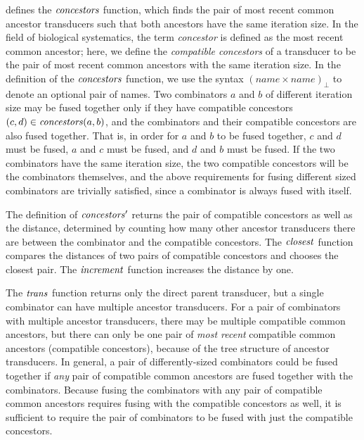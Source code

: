  defines the $\mathit{concestors}$ function, which finds the pair of most recent common ancestor transducers such that both ancestors have the same iteration size.
In the field of biological systematics, the term \emph{concestor} is defined as the most recent common ancestor; here, we define the \emph{compatible concestors} of a transducer to be the pair of most recent common ancestors with the same iteration size.
In the definition of the $\mathit{concestors}$ function, we use the syntax $(name \times name)_\bot$ to denote an optional pair of names.
Two combinators $a$ and $b$ of different iteration size may be fused together only if they have compatible concestors $(c, d) \in \mathit{concestors}(a,b)$, and the combinators and their compatible concestors are also fused together.
That is, in order for $a$ and $b$ to be fused together, $c$ and $d$ must be fused, $a$ and $c$ must be fused, and $d$ and $b$ must be fused.
If the two combinators have the same iteration size, the two compatible concestors will be the combinators themselves, and the above requirements for fusing different sized combinators are trivially satisfied, since a combinator is always fused with itself.

The definition of $\mathit{concestors}'$ returns the pair of compatible concestors as well as the distance, determined by counting how many other ancestor transducers there are between the combinator and the compatible concestors.
The $\mathit{closest}$ function compares the distances of two pairs of compatible concestors and chooses the closest pair.
The $\mathit{increment}$ function increases the distance by one.

The $\mathit{trans}$ function returns only the direct parent transducer, but a single combinator can have multiple ancestor transducers.
For a pair of combinators with multiple ancestor transducers, there may be multiple compatible common ancestors, but there can only be one pair of \emph{most recent} compatible common ancestors (compatible concestors), because of the tree structure of ancestor transducers.
In general, a pair of differently-sized combinators could be fused together if \emph{any} pair of compatible common ancestors are fused together with the combinators.
Because fusing the combinators with any pair of compatible common ancestors requires fusing with the compatible concestors as well, it is sufficient to require the pair of combinators to be fused with just the compatible concestors.


